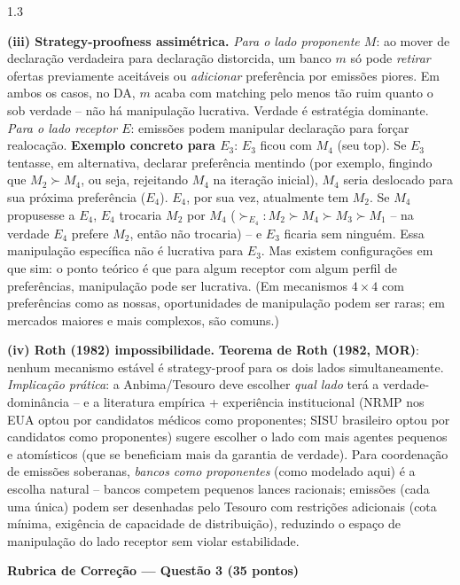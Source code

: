 \documentclass[11pt,addpoints]{exam}
\begin{document}
\begin{spacing}{1.3}
\begin{questions}
\begin{parts}
\begin{solution}
\textbf{(iii) Strategy-proofness assimétrica.} \emph{Para o lado proponente $M$}: ao mover de declaração verdadeira para declaração distorcida, um banco $m$ só pode \emph{retirar} ofertas previamente aceitáveis ou \emph{adicionar} preferência por emissões piores. Em ambos os casos, no DA, $m$ acaba com matching pelo menos tão ruim quanto o sob verdade -- não há manipulação lucrativa. Verdade é estratégia dominante. \emph{Para o lado receptor $E$}: emissões podem manipular declaração para forçar realocação. \textbf{Exemplo concreto para $E_3$}: $E_3$ ficou com $M_4$ (seu top). Se $E_3$ tentasse, em alternativa, declarar preferência mentindo (por exemplo, fingindo que $M_2 \succ M_4$, ou seja, rejeitando $M_4$ na iteração inicial), $M_4$ seria deslocado para sua próxima preferência ($E_4$). $E_4$, por sua vez, atualmente tem $M_2$. Se $M_4$ propusesse a $E_4$, $E_4$ trocaria $M_2$ por $M_4$ ($\succ_{E_4}: M_2 \succ M_4 \succ M_3 \succ M_1$ -- na verdade $E_4$ prefere $M_2$, então não trocaria) -- e $E_3$ ficaria sem ninguém. Essa manipulação específica não é lucrativa para $E_3$. Mas existem configurações em que sim: o ponto teórico é que para algum receptor com algum perfil de preferências, manipulação pode ser lucrativa. (Em mecanismos $4 \times 4$ com preferências como as nossas, oportunidades de manipulação podem ser raras; em mercados maiores e mais complexos, são comuns.)

\textbf{(iv) Roth (1982) impossibilidade.} \textbf{Teorema de Roth (1982, MOR)}: nenhum mecanismo estável é strategy-proof para os dois lados simultaneamente. \emph{Implicação prática}: a Anbima/Tesouro deve escolher \emph{qual lado} terá a verdade-dominância -- e a literatura empírica + experiência institucional (NRMP nos EUA optou por candidatos médicos como proponentes; SISU brasileiro optou por candidatos como proponentes) sugere escolher o lado com mais agentes pequenos e atomísticos (que se beneficiam mais da garantia de verdade). Para coordenação de emissões soberanas, \emph{bancos como proponentes} (como modelado aqui) é a escolha natural -- bancos competem pequenos lances racionais; emissões (cada uma única) podem ser desenhadas pelo Tesouro com restrições adicionais (cota mínima, exigência de capacidade de distribuição), reduzindo o espaço de manipulação do lado receptor sem violar estabilidade.
\end{solution}

\end{parts}

\ifprintanswers
\vspace{1em}
{\color{rubred}
\noindent\textbf{Rubrica de Correção --- Questão 3 (35 pontos)}
\vspace{0.3em}

}
\end{questions}
\end{spacing}
\end{document}
